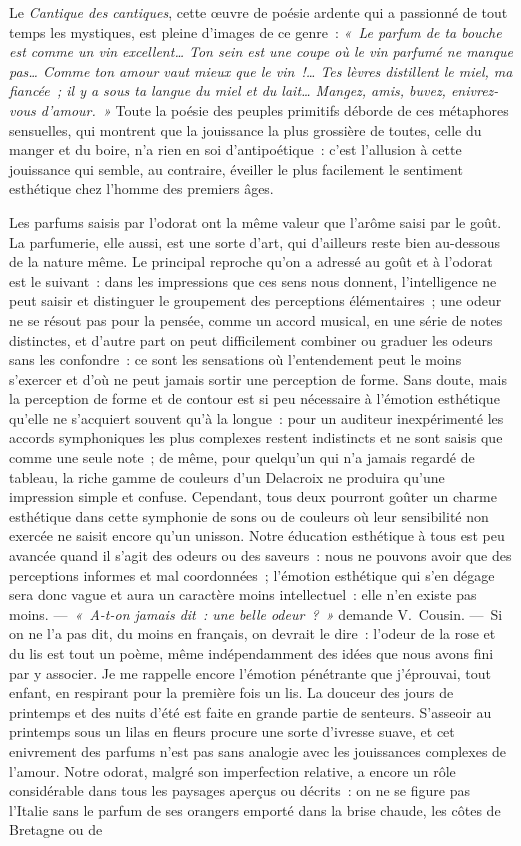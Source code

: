 \documentclass[french,twoside]{book} %
\begin{document}
\noindent Le \emph{Cantique des cantiques}, cette œuvre de poésie ardente qui a passionné de tout temps les mystiques, est pleine d’images de ce genre : \emph{« Le parfum de ta bouche est comme un vin excellent… Ton sein est une coupe où le vin parfumé ne manque pas… Comme ton amour vaut mieux que le vin !… Tes lèvres distillent le miel, ma fiancée ; il y a sous ta langue du miel et du lait… Mangez, amis, buvez, enivrez-vous d’amour. »} Toute la poésie des peuples  primitifs déborde de ces métaphores sensuelles, qui montrent que la jouissance la plus grossière de toutes, celle du manger et du boire, n’a rien en soi d’antipoétique : c’est l’allusion à cette jouissance qui semble, au contraire, éveiller le plus facilement le sentiment esthétique chez l’homme des premiers âges.\par
Les parfums saisis par l’odorat ont la même valeur que l’arôme saisi par le goût. La parfumerie, elle aussi, est une sorte d’art, qui d’ailleurs reste bien au-dessous de la nature même. Le principal reproche qu’on a adressé au goût et à l’odorat est le suivant : dans les impressions que ces sens nous donnent, l’intelligence ne peut saisir et distinguer le groupement des perceptions élémentaires ; une odeur ne se résout pas pour la pensée, comme un accord musical, en une série de notes distinctes, et d’autre part on peut difficilement combiner ou graduer les odeurs sans les confondre : ce sont les sensations où l’entendement peut le moins s’exercer et d’où ne peut jamais sortir une perception de forme. Sans doute, mais la perception de forme et de contour est si peu nécessaire à l’émotion esthétique qu’elle ne s’acquiert souvent qu’à la longue : pour un auditeur inexpérimenté les accords symphoniques les plus complexes restent indistincts et ne sont saisis que comme une seule note ; de même, pour quelqu’un qui n’a jamais regardé de tableau, la riche gamme de couleurs d’un Delacroix ne produira qu’une impression simple et confuse. Cependant, tous deux pourront goûter un charme esthétique dans cette symphonie de sons ou de couleurs où leur sensibilité non exercée ne saisit encore qu’un  unisson. Notre éducation esthétique à tous est peu avancée quand il s’agit des odeurs ou des saveurs : nous ne pouvons avoir que des perceptions informes et mal coordonnées ; l’émotion esthétique qui s’en dégage sera donc vague et aura un caractère moins intellectuel : elle n’en existe pas moins. — \emph{« A-t-on jamais dit : une belle odeur ? »} demande V. Cousin. — Si on ne l’a pas dit, du moins en français, on devrait le dire : l’odeur de la rose et du lis est tout un poème, même indépendamment des idées que nous avons fini par y associer. Je me rappelle encore l’émotion pénétrante que j’éprouvai, tout enfant, en respirant pour la première fois un lis. La douceur des jours de printemps et des nuits d’été est faite en grande partie de senteurs. S’asseoir au printemps sous un lilas en fleurs procure une sorte d’ivresse suave, et cet enivrement des parfums n’est pas sans analogie avec les jouissances complexes de l’amour. Notre odorat, malgré son imperfection relative, a encore un rôle considérable dans tous les paysages aperçus ou décrits : on ne se figure pas l’Italie sans le parfum de ses orangers emporté dans la brise chaude, les côtes de Bretagne ou de 
\end{document}
